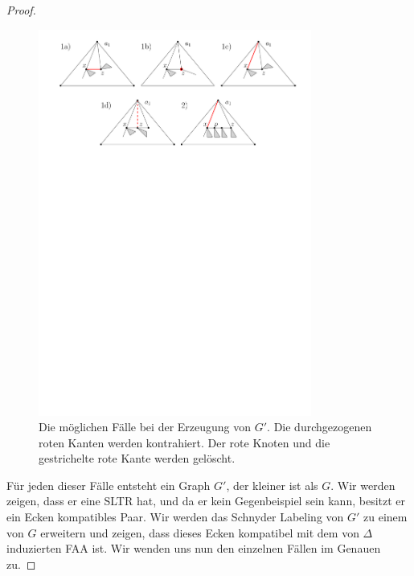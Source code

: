 \begin{proof}
\begin{figure}
	\centering
	  \includegraphics[width=0.8\textwidth]{lem5_2.pdf}
    	\caption{Die möglichen Fälle bei der Erzeugung von $G'$. Die durchgezogenen roten Kanten werden kontrahiert. Der rote Knoten und die gestrichelte rote Kante werden gelöscht.}
    	\label{pic_lem5_2}
\end{figure}

Für jeden dieser Fälle entsteht ein Graph $G'$, der kleiner ist als $G$. Wir werden zeigen, dass er eine SLTR hat, und da er kein Gegenbeispiel sein kann, besitzt er ein Ecken kompatibles Paar. Wir werden das Schnyder Labeling von $G'$ zu einem von $G$ erweitern und zeigen, dass dieses Ecken kompatibel mit dem von $\Delta$ induzierten FAA ist. Wir wenden uns nun den einzelnen Fällen im Genauen zu. 


\end{proof}
